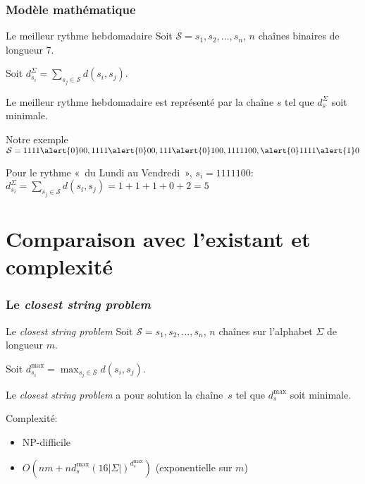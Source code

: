 \documentclass[table]{beamer}
\newcommand{\+}{\cellcolor[gray]{1}\bfseries}
\newcommand{\<}{\cellcolor[gray]{0.8}\rmfamily\itshape}
\def\S{\mathcal{S}}
\newcommand{\nologo}{\setbeamertemplate{logo}{}}
\newcommand*{\foreign}[2][english]{%
    \emph{\foreignlanguage{#1}{#2}}%
}
\newenvironment{dispmath}{%
    \centering\begin{math}\displaystyle
}{\end{math}\par}
\begin{document}
{\nologo
\begin{frame}
  \frametitle{Modèle mathématique}

  \begin{block}{Le meilleur rythme hebdomadaire}
    Soit $\S = s_1, s_2, \ldots, s_n$, $n$ chaînes binaires de
    longueur 7.

    Soit $\displaystyle d^\Sigma_{s_i} = \sum_{s_j\in\S} d(s_i, s_j)$.

    Le meilleur rythme hebdomadaire est représenté par la chaîne $s$
    tel que $d^\Sigma_s$ soit minimale.
  \end{block}

  \begin{block}{Notre exemple}
    \begin{dispmath}
      \S = 1111\alert{0}00, 1111\alert{0}00, 111\alert{0}100, 1111100,
      \alert{0}1111\alert{1}0
    \end{dispmath}

    Pour le rythme «~du Lundi au Vendredi~», $s_i = 1111100$:
    \begin{dispmath}
      d^\Sigma_{s_i} = \sum_{s_j\in\S} d(s_i, s_j)
      = 1 + 1 + 1 + 0 + 2 = 5
    \end{dispmath}
  \end{block}
\end{frame}
}

\section{Comparaison avec l'existant et complexité}

\begin{frame}
  \frametitle{Le \foreign{closest string problem}}

  \begin{block}{Le \foreign{closest string problem}}
    Soit $\S = s_1, s_2, \ldots, s_n$, $n$ chaînes sur l'alphabet
    $\Sigma$ de longueur $m$.

    Soit $\displaystyle d^{\max}_{s_i} = \max_{s_j\in\S} d(s_i, s_j)$.

    Le \emph{closest string problem} a pour solution la chaîne~$s$ tel
    que $d^{\max}_s$ soit minimale.
  \end{block}

  Complexité:
  \begin{itemize}
  \item NP-difficile \cite{lanctot2003distinguishing}
  \item $O(nm + nd^{\max}_s(16|\Sigma|)^{d^{\max}_s})$
    \cite{ma2008more} (exponentielle sur $m$)
  \end{itemize}
\end{frame}
\end{document}

